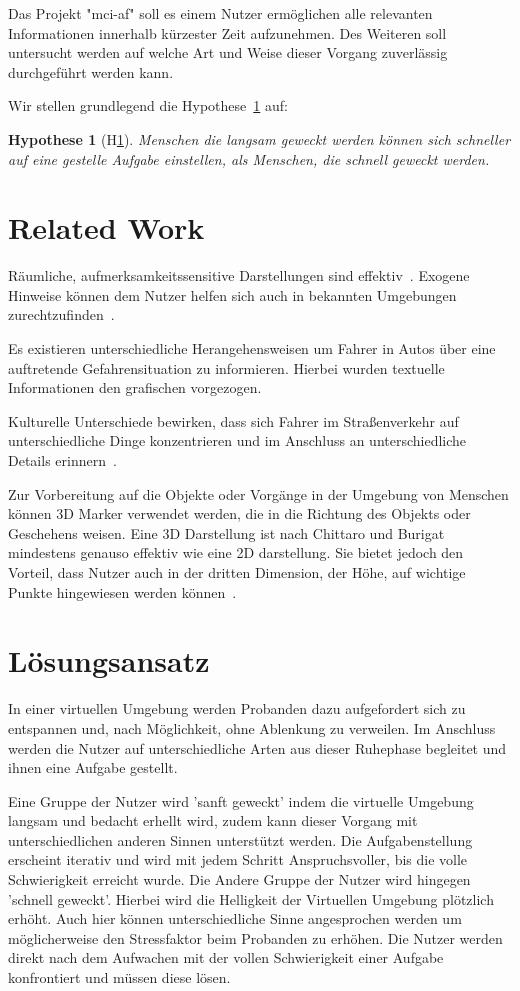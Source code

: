 \documentclass[a4paper, 11pt]{article}
\newtheorem{hyp}{Hypothese}
\newcommand{\projectName}{mci-af}
\begin{document}
Das Projekt "\projectName" soll es einem Nutzer ermöglichen alle relevanten Informationen innerhalb kürzester Zeit aufzunehmen. Des Weiteren soll untersucht werden auf welche Art und Weise dieser Vorgang zuverlässig durchgeführt werden kann.

Wir stellen grundlegend die Hypothese~\ref{hyp:aufwachen} auf:
\begin{hyp}[H\ref{hyp:aufwachen}]\label{hyp:aufwachen}
	Menschen die langsam geweckt werden können sich schneller auf eine gestelle Aufgabe einstellen, als Menschen, die schnell geweckt werden.
\end{hyp}

\section*{Related Work}
Räumliche, aufmerksamkeitssensitive Darstellungen sind effektiv~\cite{bonanni2005attention}. Exogene Hinweise können dem Nutzer helfen sich auch in bekannten Umgebungen zurechtzufinden~\cite{bonanni2005attention}.

Es existieren unterschiedliche Herangehensweisen um Fahrer in Autos über eine auftretende Gefahrensituation zu informieren. Hierbei wurden textuelle Informationen den grafischen vorgezogen.~\cite{green1995hazard}

Kulturelle Unterschiede bewirken, dass sich Fahrer im Straßenverkehr auf unterschiedliche Dinge konzentrieren und im Anschluss an unterschiedliche Details erinnern~\cite{yumiko2017VisAttention}.

Zur Vorbereitung auf die Objekte oder Vorgänge in der Umgebung von Menschen können 3D Marker verwendet werden, die in die Richtung des Objekts oder Geschehens weisen. Eine 3D Darstellung ist nach Chittaro und Burigat mindestens genauso effektiv wie eine 2D darstellung. Sie bietet jedoch den Vorteil, dass Nutzer auch in der dritten Dimension, der Höhe, auf wichtige Punkte hingewiesen werden können~\cite{chittaro20043d}.

\section*{Lösungsansatz}
In einer virtuellen Umgebung werden Probanden dazu aufgefordert sich zu entspannen und, nach Möglichkeit, ohne Ablenkung zu verweilen. Im Anschluss werden die Nutzer auf unterschiedliche Arten aus dieser Ruhephase begleitet und ihnen eine Aufgabe gestellt. 

Eine Gruppe der Nutzer wird 'sanft geweckt' indem die virtuelle Umgebung langsam und bedacht erhellt wird, zudem kann dieser Vorgang mit unterschiedlichen anderen Sinnen unterstützt werden. Die Aufgabenstellung erscheint iterativ und wird mit jedem Schritt Anspruchsvoller, bis die volle Schwierigkeit erreicht wurde. 
Die Andere Gruppe der Nutzer wird hingegen 'schnell geweckt'. Hierbei wird die Helligkeit der Virtuellen Umgebung plötzlich erhöht. Auch hier können unterschiedliche Sinne angesprochen werden um möglicherweise den Stressfaktor beim Probanden zu erhöhen. Die Nutzer werden direkt nach dem Aufwachen mit der vollen Schwierigkeit einer Aufgabe konfrontiert und müssen diese lösen.
\end{document}
